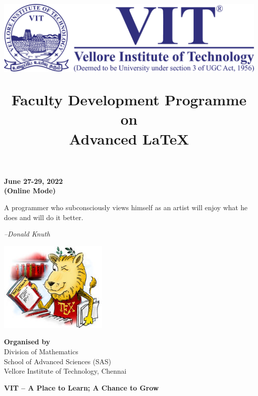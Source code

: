 
	\title{
		\includegraphics[width=.5\textwidth]{img/vitlogo}
		
		\Large\color{Maroon}\setmainfont{calligrapher}
		\bf
		Faculty Development Programme \\ on \\
		\Huge Advanced \LaTeX
	}
	\date{}



\maketitle

\vspace{-5\baselineskip}
\begin{center}
	\large \bf
	June 27-29, 2022 \\
\textcolor{secondaryColor}{(Online Mode)}
\end{center}



\begin{shadequote}
	
	\vspace{10pt}
	A programmer who subconsciously views himself as an artist will enjoy what he does and will do it better.
	
	\hfill \emph{--Donald Knuth}
	
\end{shadequote}

\begin{center}
	\includegraphics[width=.6\textwidth]{img/lion}
\end{center}
\vspace{-2\baselineskip}
\begin{center}
\textcolor{primaryColor}{\textbf{Organised by}} \\
Division of Mathematics\\
School of Advanced Sciences (SAS)\\
Vellore Institute of Technology, Chennai
\end{center}
%
\begin{center}
	\color{primaryColor} 
	\small \bf
	VIT -- A Place to Learn; A Chance to Grow
\end{center}

